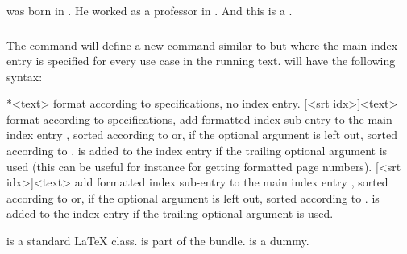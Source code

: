 \documentclass{cnpkgdoc}
\begin{document}
\begin{beispiel}
  was born in
 . He worked as a
 professor in . And this is a
 .
\end{beispiel}

\subsubsection{}\label{ssec:command:usage:newsubmainidxcmd}
The command  will define
a new command  similar to  but where the main
index entry is specified for every use case in the running text.  
will have the following syntax:
\begin{beschreibung}
  *{<text>}\newline
    format  according to specifications, no index entry.
  [<srt idx>]{<text>}\newline
    format  according to specifications, add formatted index
    sub-entry to the main index entry , sorted according to
     or, if the optional argument is left out, sorted
    according to .   is added to the index entry if
    the trailing optional argument is used (this can be useful for instance
    for getting formatted page numbers).
  [<srt idx>]{<text>}\newline
    add formatted index sub-entry to the main index entry ,
    sorted according to  or, if the optional argument is left
    out, sorted according to .   is added to the
    index entry if the trailing optional argument is used.
\end{beschreibung}

\begin{beispiel}
  is a standard \LaTeX{} class.
  is part of the \KOMAScript{} bundle.
  is a dummy.
\end{beispiel}
\end{document}
